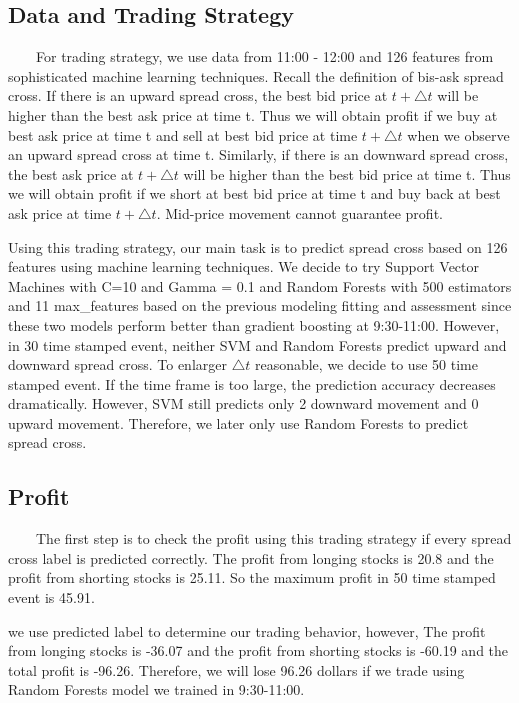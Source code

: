\documentclass[11pt]{article}
\begin{document}
\subsection{Data and Trading Strategy}
\ \ \ \ For trading strategy, we use data from 11:00 - 12:00 and 126 features from sophisticated machine learning techniques. Recall the definition of bis-ask spread cross. If there is an upward spread cross, the best bid price at $t+\bigtriangleup{t}$ will be higher than the best ask price at time t. Thus we will obtain profit if we buy at best ask price at time t and sell at best bid price at time $t+\bigtriangleup{t}$ when we observe an upward spread cross at time t. Similarly, if there is an downward spread cross, the best ask price at $t+\bigtriangleup{t}$ will be higher than the best bid price at time t.  Thus we will obtain profit if we short at best bid price at time t and buy back at best ask price at time $t+\bigtriangleup{t}$. Mid-price movement cannot guarantee profit.
\par 
Using this trading strategy, our main task is to predict spread cross based on 126 features using machine learning techniques. We decide to try Support Vector Machines with C=10 and Gamma = 0.1 and Random Forests with 500 estimators and 11 max\_features based on the previous modeling fitting and assessment since these two models perform better than gradient boosting at 9:30-11:00. However, in 30 time stamped event, neither SVM and Random Forests predict upward and downward spread cross. To enlarger $\bigtriangleup{t}$ reasonable, we decide to use 50 time stamped event. If the time frame is too large, the prediction accuracy decreases dramatically. However, SVM still predicts only 2 downward movement and 0 upward movement. Therefore, we later only use Random Forests to predict spread cross.
\subsection{Profit}
\ \ \ \ The first step is to check the profit using this trading strategy if every spread cross label is predicted correctly. The profit from longing stocks is 20.8 and the profit from shorting stocks is 25.11. So the maximum profit in 50 time stamped event is 45.91. 
\par 
we use predicted label to determine our trading behavior, however, The profit from longing stocks is -36.07 and the profit from shorting stocks is -60.19 and the total profit is -96.26. Therefore, we will lose 96.26 dollars if we trade using Random Forests model we trained in 9:30-11:00.
\end{document}
